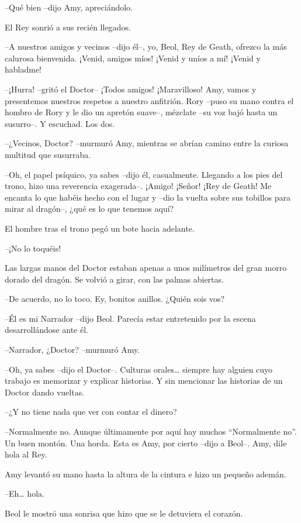 {--Qué bien --dijo Amy, apreciándolo.}

{El Rey sonrió a sus recién llegados.}

{--A nuestros amigos y vecinos --dijo él--, yo, Beol, Rey de Geath,
	ofrezco la más calurosa bienvenida. ¡Venid, amigos míos! ¡Venid y uníos
a mí! ¡Venid y habladme!}

{--¡Hurra! --gritó el Doctor-- ¡Todos amigos! ¡Maravilloso! Amy, vamos
	y presentemos nuestros respetos a nuestro anfitrión. Rory --puso su mano
	contra el hombro de Rory y le dio un apretón suave--, mézclate --su voz
bajó hasta un susurro--. Y escuchad. Los dos.}

{--¿Vecinos, Doctor? --murmuró Amy, mientras se abrían camino entre la
curiosa multitud que susurraba.}

{--Oh, el papel psíquico, ya sabes --dijo él, casualmente. Llegando a
	los pies del trono, hizo una reverencia exagerada--. ¡Amigo! ¡Señor!
	¡Rey de Geath! Me encanta lo que habéis hecho con el lugar y --dio la
	vuelta sobre sus tobillos para mirar al dragón--, ¿qué es lo que tenemos
aquí?}

{El hombre tras el trono pegó un bote hacia adelante.}

{--¡No lo toquéis!}

{Las largas manos del Doctor estaban apenas a unos milímetros del gran
morro dorado del dragón. Se volvió a girar, con las palmas abiertas.}

{--De acuerdo, no lo toco. Ey, bonitos anillos. ¿Quién sois vos?}

{--Él es mi Narrador --dijo Beol. Parecía estar entretenido por la
escena desarrollándose ante él.}

{--Narrador, ¿Doctor? --murmuró Amy.}

{--Oh, ya sabes --dijo el Doctor--. Culturas orales\ldots{} siempre
	hay alguien cuyo trabajo es memorizar y explicar historias. Y sin
mencionar las historias de un Doctor dando vueltas.}

{--¿Y no tiene nada que ver con contar el dinero?}

{--Normalmente no. Aunque últimamente por aquí hay muchos
	``Normalmente no''. Un buen montón. Una horda. Esta es Amy, por cierto
--dijo a Beol--. Amy, dile hola al Rey.}

{Amy levantó su mano hasta la altura de la cintura e hizo un pequeño
ademán.}

{--Eh\ldots{} hola.}

{Beol le mostró una sonrisa que hizo que se le detuviera el corazón.}

